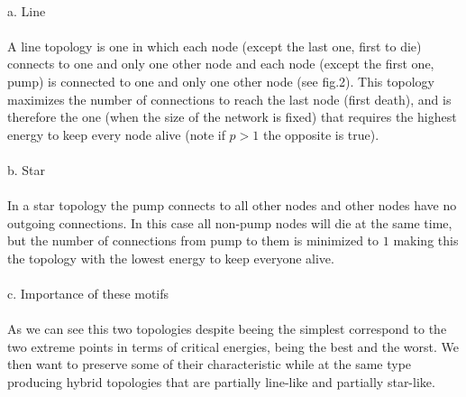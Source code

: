 \documentclass{amsart}
\theoremstyle{plain}
\numberwithin{equation}{section}
\begin{document}
\\
 a. Line\\
\\
A line topology is one in which each node (except the last one, first to die) connects to one and only one other node and each node (except the first one, pump) is connected to one and only one other node (see fig.2). This topology maximizes the number of connections to reach the last node (first death), and is therefore the one (when the size of the network is fixed) that requires the highest energy to keep every node alive (note if $p>1$ the opposite is true).\\
\\
 b. Star\\
\\
In a star topology the pump connects to all other nodes and other nodes have no outgoing connections.
In this case all non-pump nodes will die at the same time, but the number of connections from pump to them is minimized to $1$ making this the topology with the lowest energy to keep everyone alive.\\
\\
 c. Importance of these motifs\\
\\
As we can see this two topologies despite beeing the simplest correspond to the two extreme points in terms of critical energies, being the best and the worst. We then want to preserve some of their characteristic while at the same type producing hybrid topologies that are partially line-like and partially star-like.
\\
\\
\\
\end{document}
